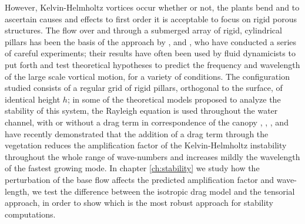 However, Kelvin-Helmholtz vortices occur whether or not, the plants bend and to ascertain causes and effects to first order it is acceptable to focus on rigid porous structures.
The flow over and through a submerged array of rigid, cylindrical pillars has been the basis of the approach by \citet{ghisalberti2002mixing}, \citet{ghisalberti2004limited} and \citet{ghisalberti2005mass}, who have conducted a series of careful experiments; their results have often been used by fluid dynamicists to put forth and test theoretical hypotheses to predict the frequency and
wavelength of the large scale vortical motion, for a variety of conditions.
The configuration studied consists of a regular grid of rigid pillars, orthogonal to the surface, of identical height $h$; in some
of the theoretical models proposed to analyze the stability of this system, the Rayleigh equation is
used throughout the water channel, with or without a drag term in correspondence of the canopy \citet{raupach1996coherent}, \citet{py2004mixing}, \citet{singh2016linear}, \citet{zampogna2016instability} and \citet{luminari2016drag} have recently demonstrated that the addition of a drag term through the vegetation reduces the amplification factor of the Kelvin-Helmholtz instability throughout the whole range of wave-numbers and increases mildly the wavelength of the fastest growing mode.
In chapter \ref{ch:stability} we study how the perturbation of the base flow affects the predicted amplification factor and wave-length, we test the difference between the isotropic drag model and the tensorial approach, in order to show which is the most robust approach for stability computations.





